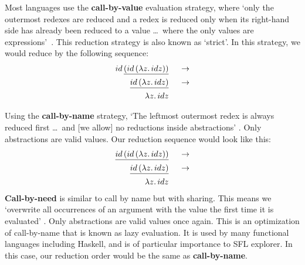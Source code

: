\noindent Most languages use the \textbf{call-by-value} evaluation strategy, where `only the outermost redexes are reduced and a redex is reduced only when its right-hand side has already been reduced to a value \ldots\ where the only values are \lambda expressions'~\cite{pierce2002types}. This reduction strategy is also known as `strict'. In this strategy, we would reduce by the following sequence:
\begin{alignat*}{2}
id\,\underline{(id\,(\lambda z.\, id z))}  && \;\;\rightarrow\\ 
\underline{id\,(\lambda z.\, id z)}        && \;\;\rightarrow\\ 
\lambda z.\, id z                          && \;\;\\ 
\end{alignat*}

\noindent Using the \textbf{call-by-name} strategy, `The leftmost outermost redex is always reduced first \ldots\ and [we allow] no reductions inside abstractions' \cite{pierce2002types}. Only abstractions are valid values. Our reduction sequence would look like this:
\begin{alignat*}{2}
\underline{id\,(id\,(\lambda z.\, id z))}  && \;\;\rightarrow\\ 
\underline{id\,(\lambda z.\, id z)}        && \;\;\rightarrow\\ 
\lambda z.\, id z                          && \;\;\\ 
\end{alignat*}
\noindent \textbf{Call-by-need} is similar to call by name but with sharing. This means we `overwrite all occurrences of an argument with the value the first time it is evaluated' \cite{pierce2002types}. Only abstractions are valid values once again. This is an optimization of call-by-name that is known as lazy evaluation. It is used by many functional languages including Haskell, and is of particular importance to SFL explorer. In this case, our reduction order would be the same as \textbf{call-by-name}. 



